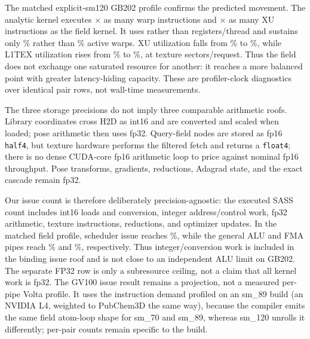 The matched explicit-sm120 GB202 profile confirms the predicted movement. The
analytic kernel executes \RooflineAnalyticToFieldInstructions{}$\times$ as many
warp instructions and \RooflineAnalyticToFieldXuInstructions{}$\times$ as many
XU instructions as the field kernel. It uses
\RooflineAnalyticRegistersPerThread{} rather than
\RooflineFieldRegistersPerThread{} registers/thread and sustains only
\RooflineAnalyticActiveWarpsPercent\% rather than
\RooflineFieldActiveWarpsPercent\% active warps. XU utilization falls from
\RooflineAnalyticXuUtilizationPercent\% to
\RooflineFieldXuUtilizationPercent\%, while L1TEX utilization rises from
\RooflineAnalyticLoneTexUtilizationPercent\% to
\RooflineFieldLoneTexUtilizationPercent\%, at
\RooflineFieldTextureSectorsPerRequest{} texture sectors/request. Thus the
field does not exchange one saturated resource for another: it reaches a more
balanced point with greater latency-hiding capacity. These are profiler-clock
diagnostics over identical pair rows, not wall-time measurements.

The three storage precisions do not imply three comparable arithmetic roofs.
Library coordinates cross H2D as int16 and are converted and scaled when loaded;
pose arithmetic then uses fp32. Query-field nodes are stored as fp16
\texttt{half4}, but texture hardware performs the filtered fetch and returns a
\texttt{float4}; there is no dense CUDA-core fp16 arithmetic loop to price
against nominal fp16 throughput. Pose transforms, gradients, reductions,
Adagrad state, and the exact cascade remain fp32.

Our issue count is therefore deliberately precision-agnostic: the executed
SASS count includes int16 loads and conversion, integer address/control work,
fp32 arithmetic, texture instructions, reductions, and optimizer updates. In
the matched field profile, scheduler issue reaches
\RooflineFieldIssueUtilizationPercent\%, while the general ALU and FMA pipes
reach \RooflineFieldAluUtilizationPercent\% and
\RooflineFieldFmaUtilizationPercent\%, respectively. Thus integer/conversion
work is included in the binding issue roof and is not close to an independent
ALU limit on GB202. The separate FP32 row is only a subresource ceiling, not a
claim that all kernel work is fp32. The GV100 issue result remains a projection,
not a measured per-pipe Volta profile. It uses the instruction demand profiled
on an sm\_89 build (an NVIDIA L4, weighted to PubChem3D the same way), because
the compiler emits the same field atom-loop shape for sm\_70 and sm\_89, whereas
sm\_120 unrolls it differently; per-pair counts remain specific to the build.


